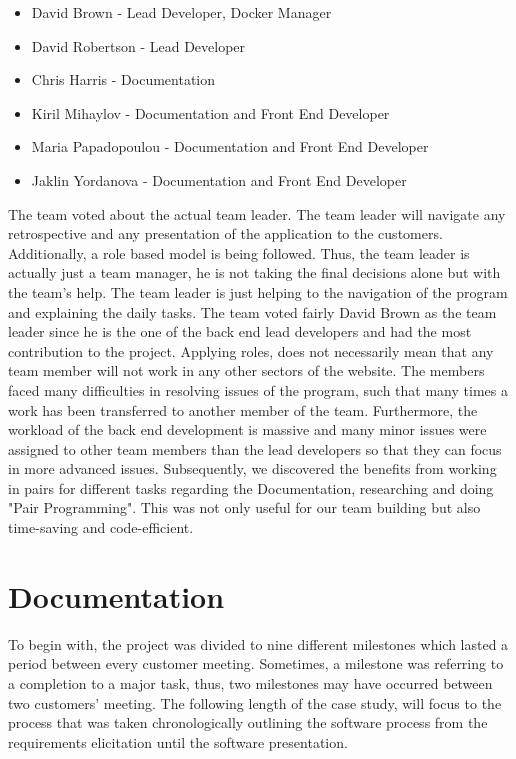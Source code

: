 \documentclass{l3proj}
\begin{document}
\begin{itemize}

\item David Brown - Lead Developer, Docker Manager

\item David Robertson - Lead Developer

\item Chris Harris - Documentation

\item Kiril Mihaylov - Documentation and Front End Developer

\item Maria Papadopoulou - Documentation and Front End Developer

\item Jaklin Yordanova - Documentation and Front End Developer

\end{itemize}
The team voted about the actual team leader. The team leader will navigate any retrospective and any presentation of the application to the customers. Additionally, a role based model is being followed. Thus, the team leader is actually just a team manager, he is not taking the final decisions alone but with the team's help. The team leader is just helping to the navigation of the program and explaining the daily tasks. The team voted fairly David Brown as the team leader since he is the one of the back end lead developers and had the most contribution to the project. Applying roles, does not necessarily mean that any team member will not work in any other sectors of the website. The members faced many difficulties in resolving issues of the program, such that many times a work has been transferred to another member of the team. Furthermore, the workload of the back end development is massive and many minor issues were assigned to other team members than the lead developers so that they can focus in more advanced issues. Subsequently, we discovered the benefits from working in pairs for different tasks regarding the Documentation, researching and doing "Pair Programming". This was not only useful for our team building but also time-saving and code-efficient.


\section{Documentation}
\label{documentation}

To begin with, the project was divided to nine different milestones which lasted a period between every customer meeting. Sometimes, a milestone was referring to a completion to a major task, thus, two milestones may have occurred between two customers' meeting. The following length of the case study, will focus to the process that was taken chronologically outlining the software process from the requirements elicitation until the software presentation.
\end{document}
